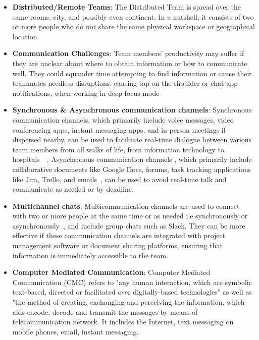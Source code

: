 \documentclass{llncs}
\begin{document}
 \begin{itemize}
    \item \textbf{Distributed/Remote Teams}: The Distributed Team is spread over the same rooms, city, and possibly even continent. In a nutshell, it consists of two or more people who do not share the same physical workspace or geographical location.~\cite{refbook1}\\
    \item \textbf{Communication Challenges}: Team members' productivity may suffer if they are unclear about where to obtain information or how to communicate well. They could squander time attempting to find information or cause their teammates needless disruptions. causing tap on the shoulder or chat app notifications, when working in deep focus mode ~\cite{refbook1}\\
    \item \textbf{Synchronous \& Asynchronous communication channels}: 
    Synchronous communication channels, which primarily include voice messages, video conferencing apps, instant messaging apps, and in-person meetings if dispersed nearby, can be used to facilitate real-time dialogue between various team members from all walks of life, from information technology to hospitals~\cite{refbook1}~\cite{refpaper1}.
    Asynchronous communication channels , which primarily include collaborative documents like Google Docs, forums, task tracking applications like Jira, Trello, and emails~\cite{refpaper2}, can be used to avoid real-time talk and communicate as needed or by deadline.~\cite{refbook1} \\
    \item \textbf{Multichannel chats}: Multicommunication channels are used to connect with two or more people at the same time or as needed i.e synchronously or asynchronously~\cite{refpaper2}, and include group chats such as Slack. They can be more effective if these communication channels are integrated with project management software or document sharing platforms, ensuring that information is immediately accessible to the team.~\cite{refpaper4}\\
    \item \textbf{Computer Mediated Communication}:  Computer Mediated Communication (CMC) refers to "any human interaction, which are symbolic text-based, directed or facilitated over digitally-based technologies" as well as "the method of creating, exchanging and perceiving the information, which aids encode, decode and transmit the messages by means of telecommunication network. It includes the Internet, text messaging on mobile phones, email, instant messaging.~\cite{refpaper5}
\end{itemize}
\end{document}
